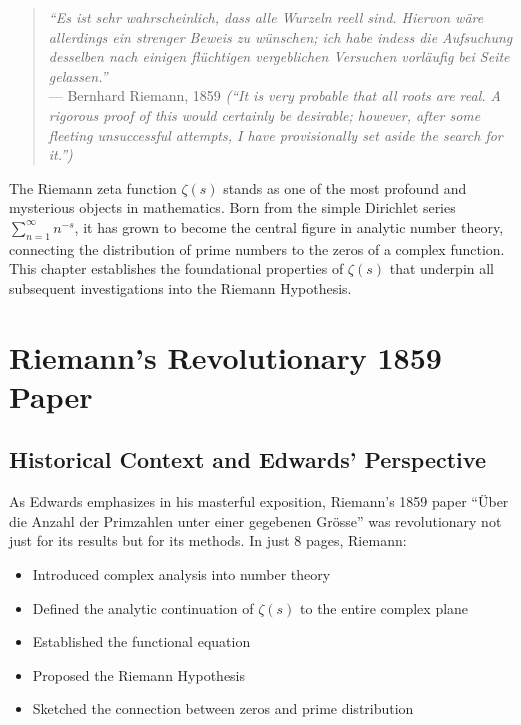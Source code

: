 

\begin{quote}
\textit{``Es ist sehr wahrscheinlich, dass alle Wurzeln reell sind. Hiervon wäre allerdings ein strenger Beweis zu wünschen; ich habe indess die Aufsuchung desselben nach einigen flüchtigen vergeblichen Versuchen vorläufig bei Seite gelassen.''} \\
--- Bernhard Riemann, 1859 \cite{riemann1859} \textit{(``It is very probable that all roots are real. A rigorous proof of this would certainly be desirable; however, after some fleeting unsuccessful attempts, I have provisionally set aside the search for it.'')}
\end{quote}

The Riemann zeta function $\zeta(s)$ stands as one of the most profound and mysterious objects in mathematics. Born from the simple Dirichlet series $\sum_{n=1}^{\infty} n^{-s}$, it has grown to become the central figure in analytic number theory, connecting the distribution of prime numbers to the zeros of a complex function. This chapter establishes the foundational properties of $\zeta(s)$ that underpin all subsequent investigations into the Riemann Hypothesis.

\section{Riemann's Revolutionary 1859 Paper}
\label{sec:riemann_1859}

\subsection{Historical Context and Edwards' Perspective}

As Edwards \cite{edwards1974} emphasizes in his masterful exposition, Riemann's 1859 paper ``\"Uber die Anzahl der Primzahlen unter einer gegebenen Gr\"osse'' was revolutionary not just for its results but for its methods. In just 8 pages, Riemann:

\begin{itemize}
\item Introduced complex analysis into number theory
\item Defined the analytic continuation of $\zeta(s)$ to the entire complex plane
\item Established the functional equation
\item Proposed the Riemann Hypothesis
\item Sketched the connection between zeros and prime distribution
\end{itemize}

